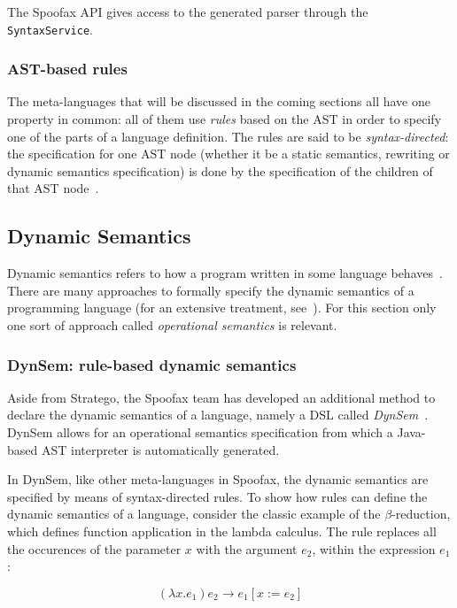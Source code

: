 The Spoofax API gives access to the generated parser through the
\texttt{SyntaxService}.

\subsubsection{AST-based rules}
\label{ssec:orgheadline2}
The meta-languages that will be discussed in the coming sections all
have one property in common: all of them use \emph{rules} based on the AST
in order to specify one of the parts of a language definition. The
rules are said to be \emph{syntax-directed}: the specification for one AST
node (whether it be a static semantics, rewriting or dynamic semantics
specification) is done by the specification of the children of that
AST node~\cite{Winskel93}.

\subsection{Dynamic Semantics}
\label{ssec:dynamic-semantics}
Dynamic semantics refers to how a program written in some language
behaves~\cite{Winskel93}. There are many approaches to formally
specify the dynamic semantics of a programming language (for an
extensive treatment, see~\cite{Winskel93}). For this section only
one sort of approach called \emph{operational semantics} is relevant.

\subsubsection{DynSem: rule-based dynamic semantics}
\label{ssec:dynsem}
Aside from Stratego, the Spoofax team has developed an additional
method to declare the dynamic semantics of a language, namely a DSL
called \emph{DynSem}~\cite{VerguNV15}. DynSem allows for an operational
semantics specification from which a Java-based AST interpreter is
automatically generated.

In DynSem, like other meta-languages in Spoofax, the dynamic semantics
are specified by means of syntax-directed rules. To show how rules can
define the dynamic semantics of a language, consider the classic
example of the \(\beta\)-reduction, which defines function application in
the lambda calculus. The rule replaces all the occurences of the
parameter \(x\) with the argument \(e_2\), within the expression \(e_1\):

\begin{equation}
(\lambda x.e_1) e_2 \rightarrow e_1[x := e_2]
\end{equation}

